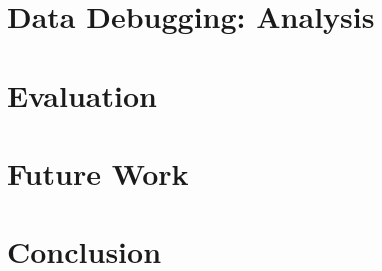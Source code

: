 \documentclass{sigplanconf}
\begin{document}
%

\section{Data Debugging: Analysis}
\label{sec:analysis}


\section{Evaluation}
\label{sec:evaluation}


\section{Future Work}
\label{sec:future}


\section{Conclusion}
\label{sec:conclusion}





% 


{


}
\end{document}

